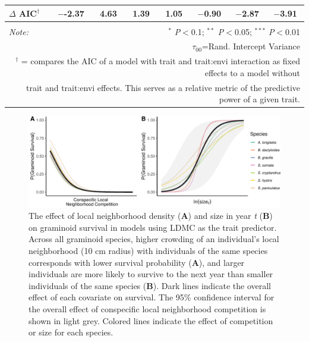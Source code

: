 \documentclass[12pt, letterpaper]{article}
\begin{document}
\begin{table}[h]
{\begin{tabular}{lccccccc}
\hline 
\rowcolor[gray]{.95}$\Delta$ AIC$^\dagger$ & $-$-2.37 & 4.63 & 1.39 & 1.05 & $-$0.90 & $-$2.87 & $-$3.91 \\
\hline 
\hline \\[-1.8ex] 
\textit{Note:}  & \multicolumn{7}{r}{$^{*}$ \textit{P}$<$0.1; $^{**}$ \textit{P}$<$0.05; $^{***}$ \textit{P}$<$0.01} \\ 
\multicolumn{8}{r}{$\tau_{00}$=Rand. Intercept Variance}\\ 
\multicolumn{8}{r}{$^\dagger$ = compares the AIC of a model with trait and trait:envi interaction as fixed effects to a model without}\\
\multicolumn{8}{r}{trait and trait:envi effects. This serves as a relative metric of the predictive power of a given trait.}
\end{tabular} }
\end{table} 

\begin{figure}
    \centering
    \includegraphics[width=.8\textwidth]{survEffectPlots-1.pdf}
    \caption{The effect of local neighborhood density (\textbf{A}) and size in year \textit{t} (\textbf{B}) on graminoid survival in models using LDMC as the trait predictor. Across all graminoid species, higher crowding of an individual's local neighborhood (10 cm radius) with individuals of the same species corresponds with lower survival probability (\textbf{A}), and larger individuals are more likely to survive to the next year than smaller individuals of the same species (\textbf{B}). Dark lines indicate the overall effect of each covariate on survival. The 95\% confidence interval for the overall effect of conspecific local neighborhood competition is shown in light grey. Colored lines indicate the effect of competition or size for each species.}
    \label{fig:Effects_Survival}
\end{figure}
\end{document}
